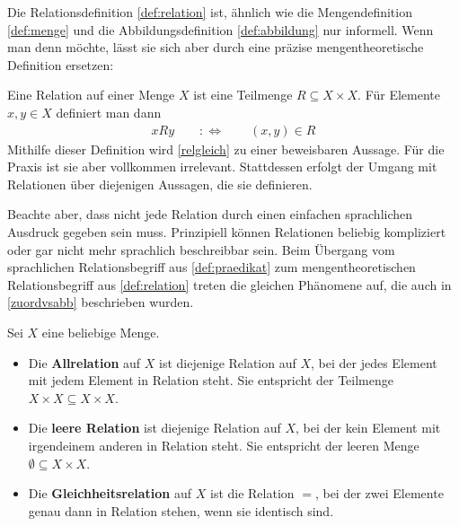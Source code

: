 \begin{vorschau}
    Die Relationsdefinition \cref{def:relation} ist, ähnlich wie die Mengendefinition \cref{def:menge} und die Abbildungsdefinition \cref{def:abbildung} nur informell. Wenn man denn möchte, lässt sie sich aber durch eine präzise mengentheoretische Definition ersetzen:
    
    Eine Relation auf einer Menge $X$ ist eine Teilmenge $R\subseteq X\times X$. Für Elemente $x,y\in X$ definiert man dann
    \begin{align*}
        xRy\qquad:\Leftrightarrow\qquad (x,y) \in R
    \end{align*}
    Mithilfe dieser Definition wird \cref{relgleich} zu einer beweisbaren Aussage. Für die Praxis ist sie aber vollkommen irrelevant. Stattdessen erfolgt der Umgang mit Relationen über diejenigen Aussagen, die sie definieren.
    
    Beachte aber, dass nicht jede Relation durch einen einfachen sprachlichen Ausdruck gegeben sein muss. Prinzipiell können Relationen beliebig kompliziert oder gar nicht mehr sprachlich beschreibbar sein. Beim Übergang vom sprachlichen Relationsbegriff aus \cref{def:praedikat} zum mengentheoretischen Relationsbegriff aus \cref{def:relation} treten die gleichen Phänomene auf, die auch in \cref{zuordvsabb} beschrieben wurden.
\end{vorschau}


\begin{bsp} \label{def:universellerelationen}  
    Sei $X$ eine beliebige Menge.
    \begin{itemize}
        \item Die \textbf{Allrelation} auf $X$ ist diejenige Relation auf $X$, bei der jedes Element mit jedem Element in Relation steht. Sie entspricht der Teilmenge $X\times X\subseteq X\times X$.
        \item Die \textbf{leere Relation} ist diejenige Relation auf $X$, bei der kein Element mit irgendeinem anderen in Relation steht. Sie entspricht der leeren Menge $\emptyset\subseteq X\times X$.
        \item Die \textbf{Gleichheitsrelation} auf $X$ ist die Relation $=$, bei der zwei Elemente genau dann in Relation stehen, wenn sie identisch sind.
    \end{itemize}
\end{bsp}


